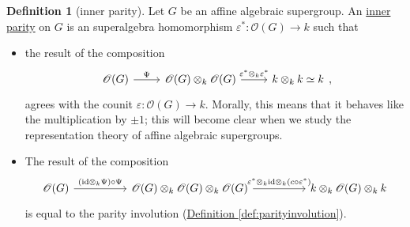 \documentclass[a4paper,10pt]{scrreprt}
\newcommand{\defn}[1]{\ul{#1}}
\theoremstyle{definition}
\newtheorem{definition}{Definition}[section]
\theoremstyle{plain}
\theoremstyle{remark}
\begin{document}
\begin{definition}[inner parity]
  \label{def:innerparity}
  Let $G$ be an affine algebraic supergroup. An \defn{inner parity} on $G$ is an superalgebra homomorphism $\varepsilon^{*}\colon \mathscr{O}(G) \to k$ such that
  \begin{itemize}
    \item the result of the composition
      \begin{equation*}
        \begin{tikzcd}
          \mathscr{O}(G) 
          \arrow[r, "\Psi"]
          & \mathscr{O}(G) \otimes_{k} \mathscr{O}(G)
          \arrow[r, "\varepsilon^{*} \otimes_{k} \varepsilon^{*}"]
          & k \otimes_{k} k \simeq k
        \end{tikzcd},
      \end{equation*}
      agrees with the counit $\varepsilon\colon \mathscr{O}(G) \to k$.
      Morally, this means that it behaves like the multiplication by $\pm 1$; this will become clear when we study the representation theory of affine algebraic supergroups.

    \item The result of the composition
      \begin{equation*}
        \begin{tikzcd}[column sep=huge]
          \mathscr{O}(G) 
          \arrow[r, "(\mathrm{id} \otimes_{k} \Psi) \circ \Psi"]
          & \mathscr{O}(G) \otimes_{k} \mathscr{O}(G) \otimes_{k} \mathscr{O}(G)
          \arrow[r, "\varepsilon^{*} \otimes_{k} \mathrm{id} \otimes_{k} (c \circ \varepsilon^{*})"]
          & k \otimes_{k} \mathscr{O}(G) \otimes_{k} k
        \end{tikzcd}
      \end{equation*}
      is equal to the parity involution (\hyperref[def:parityinvolution]{Definition \ref*{def:parityinvolution}}).
  \end{itemize}
\end{definition}
\end{document}
